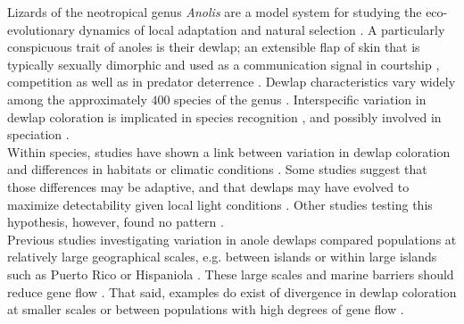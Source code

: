 
Lizards of the neotropical genus \textit{Anolis} are a model system for studying the eco-evolutionary dynamics of local adaptation and natural selection \citep{Losos2009}. A particularly conspicuous trait of anoles is their dewlap; an extensible flap of skin that is typically sexually dimorphic and used as a communication signal in courtship \citep{Sigmund1983, Driessens2014, Driessens2015}, competition \citep{Losos1985, Macedonia1994, Macedonia2013} as well as in predator deterrence \citep{Leal1995, Leal1997, Leal1997b}. Dewlap characteristics vary widely among the approximately $400$ species of the genus \citep{Nicholson2007}. Interspecific variation in dewlap coloration is implicated in species recognition \citep{Rand1970b, Williams1969, Williams1977, Losos1985, Macedonia1994, Fleishman2000, Macedonia2013}, and possibly involved in speciation \citep{Lambert2013, Geneva2015, Ng2017}.\\

Within species, studies have shown a link between variation in dewlap coloration and differences in habitats or climatic conditions \citep{Macedonia2001, Leal2002, Thorpe2002a, Thorpe2002b, Leal2004, Vanhooydonck2009, Ng2012, Ng2013, Ng2016, Vanhooydonck2009, Driessens2017}. Some studies suggest that those differences may be adaptive, and that dewlaps may have evolved to maximize detectability given local light conditions \citep{Fleishman2001, Leal2002, Leal2004}. Other studies testing this hypothesis, however, found no pattern \citep{Fleishman2009, Ng2012, Macedonia2014a}.\\ 



Previous studies investigating variation in anole dewlaps compared populations at relatively large geographical scales, e.g. between islands \citep{Vanhooydonck2009, Driessens2017} or within large islands such as Puerto Rico \citep{Leal2002, Leal2004} or Hispaniola \citep{Ng2012, Ng2016}. These large scales and marine barriers should reduce gene flow \citep{Ng2011, Lambert2013, Richardson2014, Ng2017}. That said, examples do exist of divergence in dewlap coloration at smaller scales or between populations with high degrees of gene flow \citep{Thorpe2002a, Thorpe2002b, Stapley2011, Ng2016}.\\

